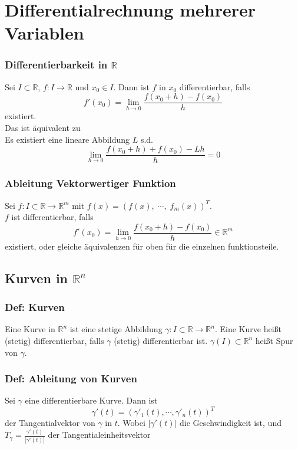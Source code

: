\chapter{Differentialrechnung mehrerer Variablen}

\subsection{Differentierbarkeit in $\mathbb R$}
Sei $I\subset \mathbb R$, $f:I\rightarrow\mathbb R$ und $x_0\in I$. Dann ist $f$ in $x_0$ differentierbar, falls
\begin{equation}
	f'(x_0) = \lim_{h\rightarrow 0}\frac{f(x_0 + h) - f(x_0)}{h}
\end{equation}
existiert.\\
Das ist äquivalent zu\\
Es existiert eine lineare Abbildung $L$ s.d.
\begin{equation}
	\lim_{h\rightarrow 0}\frac{f(x_0 + h) + f(x_0) - Lh}{h} = 0
\end{equation}

\subsection{Ableitung Vektorwertiger Funktion}

Sei $f: I\subset\mathbb R \rightarrow \mathbb R ^m$ mit $f(x) = \left(f(x),\;\cdots,\; f_m(x)\right)^T$.\\
$f$ ist differentierbar, falls
\begin{equation}
	f'(x_0) = \lim_{h\rightarrow 0}\frac{f(x_0 + h) - f(x_0)}{h}\in\mathbb R^m
\end{equation}
existiert, oder gleiche äquivalenzen für oben für die einzelnen funktionsteile.

\section{Kurven in $\mathbb R^n$}
\subsection{Def: Kurven}
Eine Kurve in $\mathbb R^n$ ist eine stetige Abbildung $\gamma: I\subset\mathbb R\rightarrow \mathbb R^n$. Eine Kurve heißt (stetig) differentierbar, falls $\gamma$ (stetig) differentierbar ist. $\gamma(I)\subset\mathbb R^n$ heißt Spur von $\gamma$.

\subsection{Def: Ableitung von Kurven}
Sei $\gamma$ eine differentierbare Kurve. Dann ist
\begin{equation}
	\gamma'(t) = \left(\gamma'_1(t), \cdots, \gamma'_n(t)\right)^T
\end{equation}
der Tangentialvektor von $\gamma$ in $t$. Wobei $|\gamma'(t)|$ die Geschwindigkeit ist, und $T_\gamma = \frac{\gamma'(t)}{|\gamma'(t)|}$ der Tangentialeinheitsvektor

